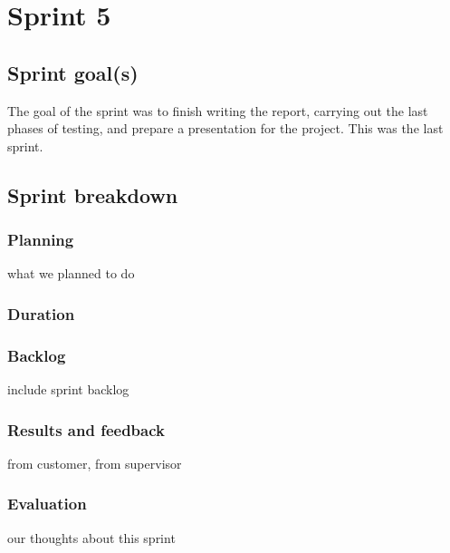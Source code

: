

\chapter{Sprint 5}
\label{Sprint0}

\section{Sprint goal(s)}
The goal of the sprint was to finish writing the report, carrying out the last
phases of testing, and prepare a presentation for the project.
This was the last sprint.

\section{Sprint breakdown}
\subsection{Planning}
what we planned to do
\subsection{Duration}
\subsection{Backlog}
include sprint backlog
\subsection{Results and feedback}
from customer, from supervisor
\subsection{Evaluation}
our thoughts about this sprint